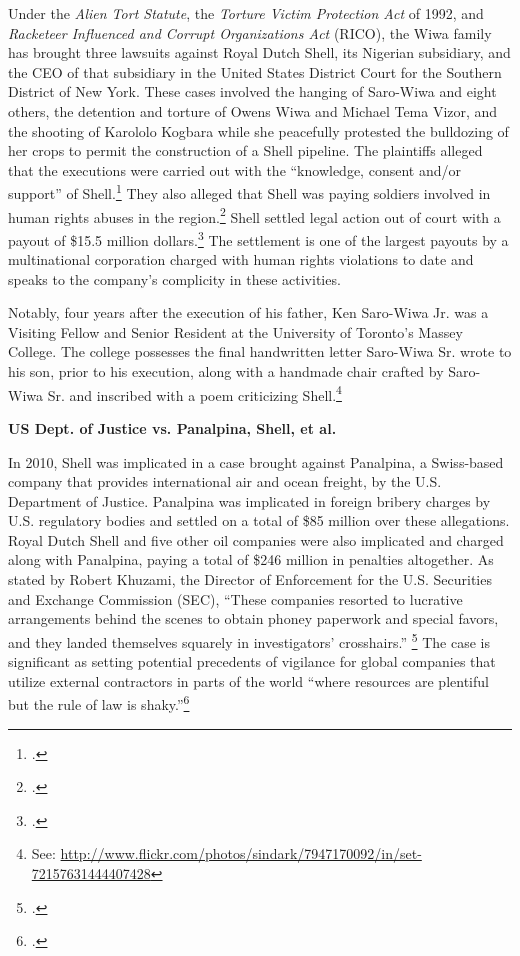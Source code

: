 Under the \emph{Alien Tort Statute}, the \emph{Torture Victim Protection Act} of 1992, and \emph{Racketeer Influenced and Corrupt Organizations Act} (RICO), the Wiwa family has brought three lawsuits against Royal Dutch Shell, its Nigerian subsidiary, and the CEO of that subsidiary in the United States District Court for the Southern District of New York.
These cases involved the hanging of Saro-Wiwa and eight others, the detention and torture of Owens Wiwa and Michael Tema Vizor, and the shooting of Karololo Kogbara while she peacefully protested the bulldozing of her crops to permit the construction of a Shell pipeline.
The plaintiffs alleged that the executions were carried out with the ``knowledge, consent and/or support'' of Shell.\footcite{ShellTrialDelayed}
They also alleged that Shell was paying soldiers involved in human rights abuses in the region.\footcite{Shell15Million}
Shell settled legal action out of court with a payout of \$15.5 million dollars.\footcite{Shell15Million}
The settlement is one of the largest payouts by a multinational corporation charged with human rights violations to date and speaks to the company's complicity in these activities.



Notably, four years after the execution of his father, Ken Saro-Wiwa Jr. was a Visiting Fellow and Senior Resident at the University of Toronto's Massey College.
The college possesses the final handwritten letter Saro-Wiwa Sr. wrote to his son, prior to his execution, along with a handmade chair crafted by Saro-Wiwa Sr. and inscribed with a poem criticizing Shell.\footnote{See: \url{http://www.flickr.com/photos/sindark/7947170092/in/set-72157631444407428}}



\textbf{US Dept. of Justice vs. Panalpina, Shell, et al.}



In 2010, Shell was implicated in a case brought against Panalpina, a Swiss-based company that provides international air and ocean freight, by the U.S. Department of Justice. 
Panalpina was implicated in foreign bribery charges by U.S. regulatory bodies and settled on a total of \$85 million over these allegations. 
Royal Dutch Shell and five other oil companies were also implicated and charged along with Panalpina, paying a total of \$246 million in penalties altogether. 
As stated by Robert Khuzami, the Director of Enforcement for the U.S. Securities and Exchange Commission (SEC), ``These companies resorted to lucrative arrangements behind the scenes to obtain phoney paperwork and special favors, and they landed themselves squarely in investigators’ crosshairs.'' \footcite[][p. 119]{KochanGoodYear_2011} 
The case is significant as setting potential precedents of vigilance for global companies that utilize external contractors in parts of the world ``where resources are plentiful but the rule of law is shaky.''\footcite[][]{Bribery_2010}



